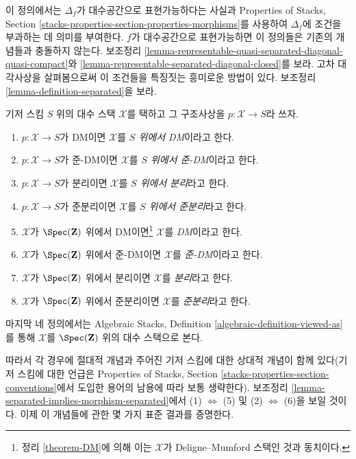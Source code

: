 \noindent
이 정의에서는 $\Delta_f$가 대수공간으로 표현가능하다는 사실과
Properties of Stacks, Section
\ref{stacks-properties-section-properties-morphisms}를 사용하여
$\Delta_f$에 조건을 부과하는 데 의미를 부여한다.
$f$가 대수공간으로 표현가능하면 이 정의들은 기존의 개념들과 충돌하지 않는다.
보조정리 \ref{lemma-representable-quasi-separated-diagonal-quasi-compact}와
\ref{lemma-representable-separated-diagonal-closed}를 보라.
고차 대각사상을 살펴봄으로써 이 조건들을 특징짓는 흥미로운 방법이 있다.
보조정리 \ref{lemma-definition-separated}을 보라.

\begin{definition}
\label{definition-absolute-separated}
기저 스킴 $S$ 위의 대수 스택 $\mathcal{X}$를 택하고
그 구조사상을 $p : \mathcal{X} \to S$라 쓰자.
\begin{enumerate}
\item $p : \mathcal{X} \to S$가 DM이면
$\mathcal{X}$를 {\it $S$ 위에서 DM}이라고 한다.
\item $p : \mathcal{X} \to S$가 준-DM이면
$\mathcal{X}$를 {\it $S$ 위에서 준-DM}이라고 한다.
\item $p : \mathcal{X} \to S$가 분리이면
$\mathcal{X}$를 {\it $S$ 위에서 분리}라고 한다.
\item $p : \mathcal{X} \to S$가 준분리이면
$\mathcal{X}$를 {\it $S$ 위에서 준분리}라고 한다.
\item $\mathcal{X}$가 $\Spec(\mathbf{Z})$ 위에서
DM이면\footnote{정리 \ref{theorem-DM}에 의해 이는
$\mathcal{X}$가 Deligne--Mumford 스택인 것과 동치이다.}
$\mathcal{X}$를 {\it DM}이라고 한다.
\item $\mathcal{X}$가 $\Spec(\mathbf{Z})$ 위에서 준-DM이면
$\mathcal{X}$를 {\it 준-DM}이라고 한다.
\item $\mathcal{X}$가 $\Spec(\mathbf{Z})$ 위에서 분리이면
$\mathcal{X}$를 {\it 분리}라고 한다.
\item $\mathcal{X}$가 $\Spec(\mathbf{Z})$ 위에서 준분리이면
$\mathcal{X}$를 {\it 준분리}라고 한다.
\end{enumerate}
마지막 네 정의에서는 Algebraic Stacks, Definition
\ref{algebraic-definition-viewed-as}를 통해 $\mathcal{X}$를
$\Spec(\mathbf{Z})$ 위의 대수 스택으로 본다.
\end{definition}

\noindent
따라서 각 경우에 절대적 개념과 주어진 기저 스킴에 대한 상대적 개념이
함께 있다(기저 스킴에 대한 언급은 Properties of Stacks, Section
\ref{stacks-properties-section-conventions}에서 도입한 용어의
남용에 따라 보통 생략한다).
보조정리 \ref{lemma-separated-implies-morphism-separated}에서
(1) $\Leftrightarrow$ (5) 및 (2) $\Leftrightarrow$ (6)을 보일 것이다.
이제 이 개념들에 관한 몇 가지 표준 결과를 증명한다.

